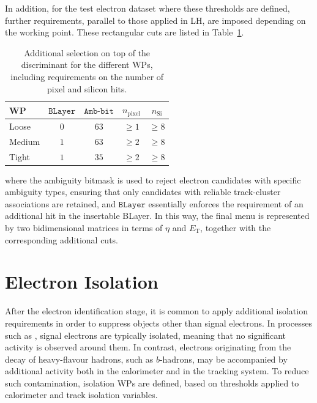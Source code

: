 In addition, for the test electron dataset where these thresholds are defined, further requirements, parallel to those applied in LH, are imposed depending on the working point. These rectangular cuts are listed in Table~\ref{tab:wp_rectangular_cuts}.

\begin{table}[htbp]
  \centering
  \footnotesize
  \begin{tabular}{lcccc}
  \hline
  WP & $\texttt{BLayer}$ & $\texttt{Amb-bit}$ & $n_{\mathrm{pixel}}$ & $n_{\mathrm{Si}}$ \\
  \hline
  Loose  & 0 & $63$ & $\geq 1$ & $\geq 8$ \\
  Medium & $1$ & $63$ & $\geq 2$ & $\geq 8$ \\
  Tight  & $1$ & $35$ & $\geq 2$ & $\geq 8$ \\
  \hline
  \end{tabular}
  \caption{Additional selection on top of the discriminant for the different WPs, including requirements on the number of pixel and silicon hits.}
  \label{tab:wp_rectangular_cuts}
\end{table}
where the ambiguity bitmask is used to reject electron candidates with specific ambiguity types, ensuring that only candidates with reliable track-cluster associations are retained, and $\texttt{BLayer}$ essentially enforces the requirement of an additional hit in the insertable BLayer. In this way, the final menu is represented by two bidimensional matrices in terms of $\eta$ and $E_{\text{T}}$, together with the corresponding additional cuts.

\section{Electron Isolation}
\label{electron_iso}

After the electron identification stage, it is common to apply additional isolation requirements in order to suppress objects other than signal electrons. In processes such as \zee, signal electrons are typically isolated, meaning that no significant activity is observed around them. In contrast, electrons originating from the decay of heavy-flavour hadrons, such as $b$-hadrons, may be accompanied by additional activity both in the calorimeter and in the tracking system. To reduce such contamination, isolation WPs are defined, based on thresholds applied to calorimeter and track isolation variables.

